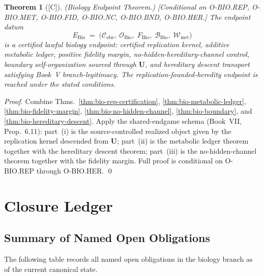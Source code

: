 \documentclass[12pt,oneside]{amsbook}
\theoremstyle{plain}
\newtheorem{theorem}{Theorem}[section]
\theoremstyle{definition}
\theoremstyle{remark}
\newcommand{\status}[1]{\textup{[#1]}}
\begin{document}
\begin{theorem}[\status{C}]\label{thm:bio-endpoint}
\textup{(Biology Endpoint Theorem.)}
\textup{[Conditional on O-BIO.REP, O-BIO.MET, O-BIO.FID, O-BIO.NC,
O-BIO.BND, O-BIO.HER.]}
The endpoint datum
\[
 E_{\mathrm{Bio}} \;=\;
 \bigl(\mathcal{C}_{\mathrm{obs}},\;
 \mathcal{O}_{\mathrm{Bio}},\;
 F_{\mathrm{Bio}},\;
 \mathcal{B}_{\mathrm{Bio}},\;
 \mathcal{W}_{\mathrm{met}}\bigr)
\]
is a certified lawful biology endpoint: certified replication kernel,
additive metabolic ledger, positive fidelity margin, no-hidden-hereditary-channel control, boundary self-organization sourced through
$\mathbf{U}$, and hereditary descent transport satisfying Book~V
branch-legitimacy. The replication-founded-heredity endpoint is
reached under the stated conditions.
\end{theorem}

\begin{proof}
Combine Thms.~\ref{thm:bio-rep-certification},
\ref{thm:bio-metabolic-ledger}, \ref{thm:bio-fidelity-margin},
\ref{thm:bio-no-hidden-channel}, \ref{thm:bio-boundary}, and
\ref{thm:bio-hereditary-descent}. Apply the shared-endgame schema
(Book~VII, Prop.~6.11): part~(i) is the source-controlled realized
object given by the replication kernel descended from $\mathbf{U}$;
part~(ii) is the metabolic ledger theorem together with the hereditary
descent theorem; part~(iii) is the no-hidden-channel theorem together
with the fidelity margin. Full proof is conditional on O-BIO.REP
through O-BIO.HER.
\qed
\end{proof}

\section{Closure Ledger}\label{sec:bio-closure}

\subsection{Summary of Named Open Obligations}

The following table records all named open obligations in the biology
branch as of the current canonical state.
\end{document}
